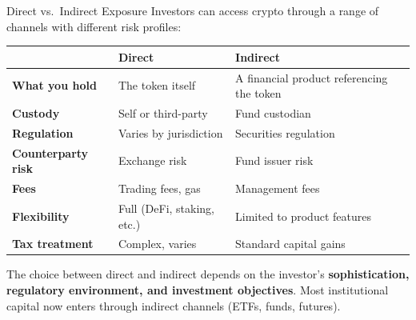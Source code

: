 \documentclass[10pt]{beamer}
\begin{document}
\begin{frame}{Direct vs.\ Indirect Exposure}
  Investors can access crypto through a range of channels with different risk profiles:
  
  \begin{center}
    \small
    \begin{tabular}{p{3cm}p{3.5cm}p{3.5cm}}
      \toprule
      & \textbf{Direct} & \textbf{Indirect} \\
      \midrule
      \textbf{What you hold} & The token itself & A financial product referencing the token \\
      \textbf{Custody} & Self or third-party & Fund custodian \\
      \textbf{Regulation} & Varies by jurisdiction & Securities regulation \\
      \textbf{Counterparty risk} & Exchange risk & Fund issuer risk \\
      \textbf{Fees} & Trading fees, gas & Management fees \\
      \textbf{Flexibility} & Full (DeFi, staking, etc.) & Limited to product features \\
      \textbf{Tax treatment} & Complex, varies & Standard capital gains \\
      \bottomrule
    \end{tabular}
  \end{center}
  
  \vspace{0.5em}
  The choice between direct and indirect depends on the investor's \textbf{sophistication, regulatory environment, and investment objectives}. Most institutional capital now enters through indirect channels (ETFs, funds, futures).
\end{frame}
\end{document}
